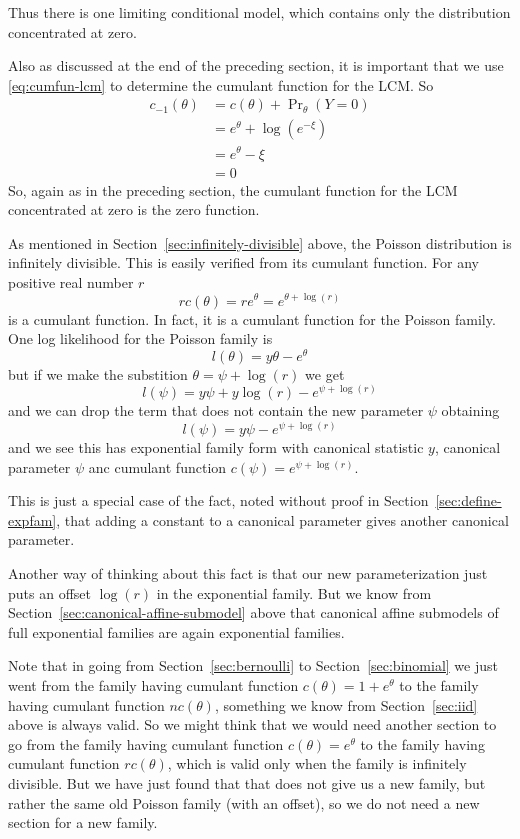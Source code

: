 Thus there is one limiting conditional model, which contains only
the distribution concentrated at zero.

Also as discussed at the end of the preceding section,
it is important that we use \eqref{eq:cumfun-lcm} to determine the cumulant
function for the LCM.  So
\begin{align*}
   c_{- 1}(\theta)
   & =
   c(\theta) + \Pr\nolimits_\theta(Y = 0)
   \\
   & =
   e^\theta 
   +
   \log (e^{- \xi})
   \\
   & =
   e^\theta 
   - \xi
   \\
   & =
   0
\end{align*}
So, again as in the preceding section, the cumulant function for the LCM
concentrated at zero is the zero function.

As mentioned in Section~\ref{sec:infinitely-divisible} above,
the Poisson distribution is infinitely divisible.
This is easily verified from its cumulant function.
For any positive real number $r$
$$
   r c(\theta) = r e^{\theta} = e^{\theta + \log(r)}
$$
is a cumulant function.  In fact, it is a cumulant function for the Poisson
family.  One log likelihood for the Poisson family is
$$
   l(\theta) = y \theta - e^\theta
$$
but if we make the substition $\theta = \psi + \log(r)$ we get
$$
   l(\psi) = y \psi + y \log(r) - e^{\psi + \log(r)}
$$
and we can drop the term that does not contain the new parameter $\psi$
obtaining
$$
   l(\psi) = y \psi - e^{\psi + \log(r)}
$$
and we see this has exponential family form with canonical statistic $y$,
canonical parameter $\psi$ anc cumulant function $c(\psi) = e^{\psi + \log(r)}$.

This is just a special case of the fact,
noted without proof in Section~\ref{sec:define-expfam},
that adding a constant to a canonical parameter gives
another canonical parameter.

Another way of thinking about this fact is that our new parameterization
just puts an offset $\log(r)$ in the exponential family.
But we know from Section~\ref{sec:canonical-affine-submodel} above
that canonical affine submodels of full exponential families are again
exponential families.

Note that in going from Section~\ref{sec:bernoulli}
to Section~\ref{sec:binomial} we just went from the family having cumulant
function $c(\theta) = 1 + e^\theta$ to the family
having cumulant function $n c(\theta)$,
something we know from Section~\ref{sec:iid} above is always valid.
So we might think that we would need another section to go from the
family having cumulant function $c(\theta) = e^\theta$ to the family
having cumulant function $r c(\theta)$, which is valid only when the
family is infinitely divisible.  But we have just found that that does
not give us a new family, but rather the same old Poisson family
(with an offset), so we do not need a new section for a new family.

